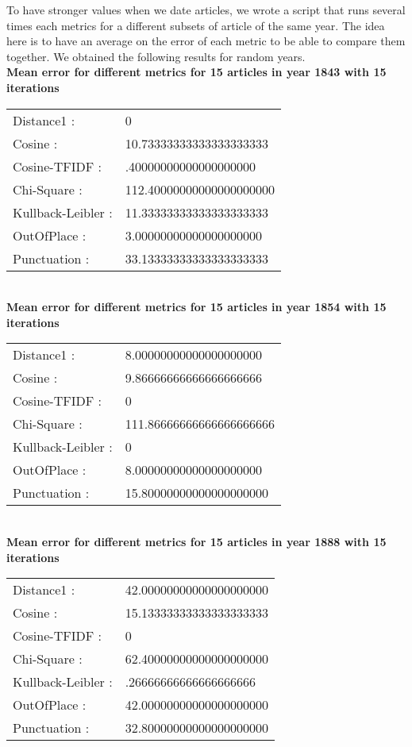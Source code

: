 To have stronger values when we date articles, we wrote a script that runs several times each metrics for a different subsets of article of the same year. The idea here is to have an average on the error of each metric to be able to compare them together. We obtained the following results for random years.\\

\textbf{Mean error for different metrics for 15 articles in year 1843 with 15 iterations}\\
\begin{tabular}{p{3cm} p{5cm}}
Distance1 :& 0\\
Cosine :& 10.73333333333333333333\\
Cosine-TFIDF :& .40000000000000000000\\
Chi-Square :& 112.40000000000000000000\\
Kullback-Leibler :& 11.33333333333333333333\\
OutOfPlace :& 3.00000000000000000000\\
Punctuation :& 33.13333333333333333333\\
\end{tabular}\\
 
\textbf{Mean error for different metrics for 15 articles in year 1854 with 15 iterations}\\
\begin{tabular}{p{3cm} p{5cm}}
    Distance1 :& 8.00000000000000000000\\
    Cosine :& 9.86666666666666666666\\
    Cosine-TFIDF :& 0\\
    Chi-Square :& 111.86666666666666666666\\
    Kullback-Leibler :& 0\\
    OutOfPlace :& 8.00000000000000000000\\
    Punctuation :& 15.80000000000000000000\\
\end{tabular}\\
 
\textbf{Mean error for different metrics for 15 articles in year 1888 with 15 iterations}\\
\begin{tabular}{p{3cm} p{5cm}}
    Distance1 :& 42.00000000000000000000\\
    Cosine :& 15.13333333333333333333\\
    Cosine-TFIDF :& 0\\
    Chi-Square :& 62.40000000000000000000\\
    Kullback-Leibler :& .26666666666666666666\\
    OutOfPlace :& 42.00000000000000000000\\
    Punctuation :& 32.80000000000000000000\\
\end{tabular}\\
 
